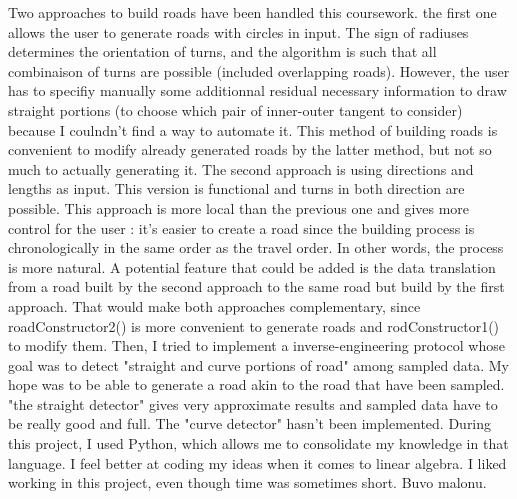 

Two approaches to build roads have been handled this coursework. the first one allows the user to generate roads with circles in input. The sign of radiuses determines the orientation of turns, and the algorithm is such that all combinaison of turns are possible (included overlapping roads). However, the user has to specifiy manually some additionnal residual necessary information to draw straight portions (to choose which pair of inner-outer tangent to consider) because I coulndn't find a way to automate it. This method of building roads is convenient to modify already generated roads by the latter method, but not so much to actually generating it. The second approach is using directions and lengths as input. This version is functional and turns in both direction are possible. This approach is more local than the previous one and gives more control for the user : it's easier to create a road since the building process is chronologically in the same order as the travel order. In other words, the process is more natural.
\newline
A potential feature that could be added is the data translation from a road built by the second approach to the same road but build by the first approach. That would make both approaches complementary, since roadConstructor2() is more convenient to generate roads and rodConstructor1() to modify them.
Then, I tried to implement a inverse-engineering protocol whose goal was to detect "straight and curve portions of road" among sampled data. My hope was to be able to generate a road akin to the road that have been sampled. "the straight detector" gives very approximate results and sampled data have to be really good and full. The "curve detector" hasn't been implemented.
\newline
During this project, I used Python, which allows me to consolidate my knowledge in that language. I feel better at coding my ideas when it comes to linear algebra. I liked working in this project, even though time was sometimes short. Buvo malonu.
